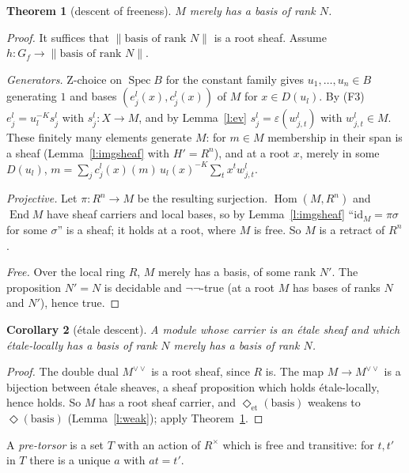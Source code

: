 \documentclass[11pt]{amsart}
\newtheorem{theorem}{Theorem}[section]
\newtheorem{corollary}[theorem]{Corollary}
\theoremstyle{definition}
\theoremstyle{remark}
\newcommand{\Spec}{\operatorname{Spec}}
\newcommand{\Hom}{\operatorname{Hom}}
\newcommand{\End}{\operatorname{End}}
\newcommand{\close}{\Diamond}
\newcommand{\closeE}{\Diamond_{\mathrm{et}}}
\newcommand{\tr}[1]{\|#1\|}
\newcommand{\Rx}{R^\times}
\begin{document}
\begin{theorem}[descent of freeness]\label{t:D}
$M$ merely has a basis of rank $N$.
\end{theorem}
\begin{proof}
It suffices that $\tr{\text{basis of rank }N}$ is a root sheaf. Assume
$h:G_f\to\tr{\text{basis of rank }N}$.

\emph{Generators.} Z-choice on $\Spec B$ for the constant family gives
$u_1,\dots,u_n\in B$ generating $1$ and bases $(e^l_j(x),c^l_j(x))$ of
$M$ for $x\in D(u_l)$. By (F3) $e^l_j=u_l^{-K}s^l_j$ with
$s^l_j:X\to M$, and by Lemma~\ref{l:ev} $s^l_j=\varepsilon(w^l_{j,t})$ with
$w^l_{j,t}\in M$. These finitely many elements generate $M$: for $m\in M$
membership in their span is a sheaf (Lemma~\ref{l:imgsheaf} with
$H'=R^n$), and at a root $x$, merely in some $D(u_l)$,
$m=\sum_jc^l_j(x)(m)\,u_l(x)^{-K}\sum_tx^tw^l_{j,t}$.

\emph{Projective.} Let $\pi:R^n\to M$ be the resulting surjection.
$\Hom(M,R^n)$ and $\End M$ have sheaf carriers and local bases, so by
Lemma~\ref{l:imgsheaf} ``$\mathrm{id}_M=\pi\sigma$ for some $\sigma$'' is
a sheaf; it holds at a root, where $M$ is free. So $M$ is a retract of
$R^n$.

\emph{Free.} Over the local ring $R$, $M$ merely has a basis, of some
rank $N'$. The proposition $N'=N$ is decidable and $\neg\neg$-true (at a
root $M$ has bases of ranks $N$ and $N'$), hence true.
\end{proof}

\begin{corollary}[\'etale descent]\label{c:etD}
A module whose carrier is an \'etale sheaf and which \'etale-locally has a
basis of rank $N$ merely has a basis of rank $N$.
\end{corollary}
\begin{proof}
The double dual $M^{\vee\vee}$ is a root sheaf, since $R$ is. The map
$M\to M^{\vee\vee}$ is a bijection between \'etale sheaves, a sheaf
proposition which holds \'etale-locally, hence holds. So $M$ has a root
sheaf carrier, and $\closeE(\text{basis})$ weakens to $\close(\text{basis})$
(Lemma~\ref{l:weak}); apply Theorem~\ref{t:D}.
\end{proof}

A \emph{pre-torsor} is a set $T$ with an action of $\Rx$ which is free
and transitive: for $t,t'$ in $T$ there is a unique $a$ with $at=t'$.
\end{document}
